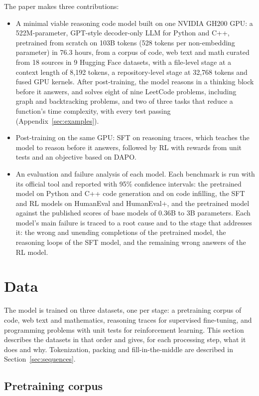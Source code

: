 \documentclass[sigconf,nonacm,balance=false]{acmart}
\begin{document}
The paper makes three contributions:
\begin{itemize}
  \item A minimal viable reasoning code model built on one NVIDIA GH200 GPU: a 522M-parameter, GPT-style decoder-only
  LLM for Python and C++, pretrained from scratch on 103B tokens (528 tokens per non-embedding parameter) in 76.3 hours,
  from a corpus of code, web text and math curated from 18 sources in 9 Hugging Face datasets, with a file-level stage
  at a context length of 8,192 tokens, a repository-level stage at 32,768 tokens and fused GPU kernels. After
  post-training, the model reasons in a thinking block before it answers, and solves eight of nine LeetCode problems,
  including graph and backtracking problems, and two of three tasks that reduce a function's time complexity, with
  every test passing (Appendix~\ref{sec:examples}).
  \item Post-training on the same GPU: SFT on reasoning traces, which teaches the model to reason before it answers,
  followed by RL with rewards from unit tests and an objective based on DAPO.
  \item An evaluation and failure analysis of each model. Each benchmark is run with its official tool and reported
  with 95\% confidence intervals: the pretrained model on Python and C++ code generation and on code infilling, the SFT
  and RL models on HumanEval and HumanEval+, and the pretrained model against the published scores of base models of
  0.36B to 3B parameters. Each model's main failure is traced to a root cause and to the stage that addresses it: the
  wrong and unending completions of the pretrained model, the reasoning loops of the SFT model, and the remaining wrong
  answers of the RL model.
\end{itemize}

\section{Data}
\label{sec:data}

The model is trained on three datasets, one per stage: a pretraining corpus of code, web text and mathematics,
reasoning traces for supervised fine-tuning, and programming problems with unit tests for reinforcement learning. This
section describes the datasets in that order and gives, for each processing step, what it does and why. Tokenization,
packing and fill-in-the-middle are described in Section~\ref{sec:sequences}.

\subsection{Pretraining corpus}
\label{sec:data-pretrain}
\end{document}
